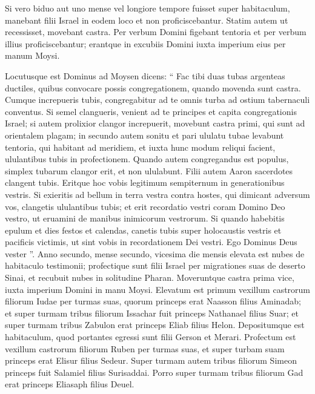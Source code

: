 \begin{biblechapter}
\begin{biblechapter}
\begin{biblechapter}
\begin{biblechapter}
\begin{biblechapter}
\begin{biblechapter}
\begin{biblechapter}
\begin{biblechapter}
\begin{biblechapter}
\verse Si vero biduo aut uno mense vel longiore tempore fuisset super habitaculum, manebant filii Israel in eodem loco et non proficiscebantur. Statim autem ut recessisset, movebant castra.
 \verse Per verbum Domini figebant tentoria et per verbum illius proficiscebantur; erantque in excubiis Domini iuxta imperium eius per manum Moysi.
 
\begin{biblechapter}
\verse Locutusque est Dominus ad Moysen dicens: 
\verse “ Fac tibi duas tubas argenteas ductiles, quibus convocare possis congregationem, quando movenda sunt castra. 
\verse Cumque increpueris tubis, congregabitur ad te omnis turba ad ostium tabernaculi conventus. 
\verse Si semel clangueris, venient ad te principes et capita congregationis Israel; 
\verse si autem prolixior clangor increpuerit, movebunt castra primi, qui sunt ad orientalem plagam; 
\verse in secundo autem sonitu et pari ululatu tubae levabunt tentoria, qui habitant ad meridiem, et iuxta hunc modum reliqui facient, ululantibus tubis in profectionem. 
\verse Quando autem congregandus est populus, simplex tubarum clangor erit, et non ululabunt. 
\verse Filii autem Aaron sacerdotes clangent tubis. Eritque hoc vobis legitimum sempiternum in generationibus vestris. 
\verse Si exieritis ad bellum in terra vestra contra hostes, qui dimicant adversum vos, clangetis ululantibus tubis; et erit recordatio vestri coram Domino Deo vestro, ut eruamini de manibus inimicorum vestrorum. 
\verse Si quando habebitis epulum et dies festos et calendas, canetis tubis super holocaustis vestris et pacificis victimis, ut sint vobis in recordationem Dei vestri. Ego Dominus Deus vester ”.
 \verse Anno secundo, mense secundo, vicesima die mensis elevata est nubes de habitaculo testimonii; 
\verse profectique sunt filii Israel per migrationes suas de deserto Sinai, et recubuit nubes in solitudine Pharan.
 \verse Moveruntque castra prima vice, iuxta imperium Domini in manu Moysi. 
\verse Elevatum est primum vexillum castrorum filiorum Iudae per turmas suas, quorum princeps erat Naasson filius Aminadab; 
\verse et super turmam tribus filiorum Issachar fuit princeps Nathanael filius Suar; 
\verse et super turmam tribus Zabulon erat princeps Eliab filius Helon.
 \verse Depositumque est habitaculum, quod portantes egressi sunt filii Gerson et Merari.
 \verse Profectum est vexillum castrorum filiorum Ruben per turmas suas, et super turbam suam princeps erat Elisur filius Sedeur. 
\verse Super turmam autem tribus filiorum Simeon princeps fuit Salamiel filius Surisaddai. 
\verse Porro super turmam tribus filiorum Gad erat princeps Eliasaph filius Deuel.

\end{biblechapter}
\end{biblechapter}
\end{biblechapter}
\end{biblechapter}
\end{biblechapter}
\end{biblechapter}
\end{biblechapter}
\end{biblechapter}
\end{biblechapter}
\end{biblechapter}
